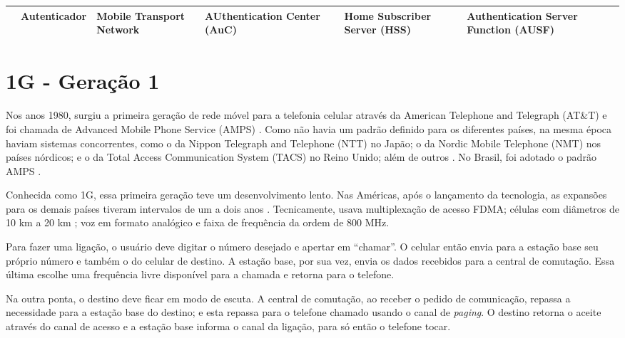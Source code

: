 \documentclass[11pt,oneside,a4paper]{abntex2}
\begin{document}
\begin{center}
\begin{longtable}{|m{1.5cm}|m{2.5cm}|m{2cm}|m{2cm}|m{2cm}|m{2cm}|m{2cm}|}
                        & Autenticador                           & Mobile Transport Network   & AUthentication Center (AuC)              &                                                                                             & Home Subscriber Server (HSS)                                    & Authentication Server Function (AUSF)                                                                                                       \\ \hline
\end{longtable}
\end{center}

\section*{1G - Geração 1}
\label{1g}

Nos anos 1980, surgiu a primeira geração de rede móvel para a telefonia celular através da American Telephone and Telegraph (AT\&T) e foi chamada de Advanced Mobile Phone Service (AMPS) \cite{tcc1}. Como não havia um padrão definido para os diferentes países, na mesma época haviam sistemas concorrentes, como o da Nippon Telegraph and Telephone (NTT) no Japão; o da Nordic Mobile Telephone (NMT) nos países nórdicos; e o da Total Access Communication System (TACS) no Reino Unido; além de outros \cite{wiki-1g-br, wiki-1g-en}. No Brasil, foi adotado o padrão AMPS \cite{tcc2}.

Conhecida como 1G, essa primeira geração teve um desenvolvimento lento. Nas Américas, após o lançamento da tecnologia, as expansões para os demais países tiveram intervalos de um a dois anos \cite{repor1}. Tecnicamente, usava multiplexação de acesso FDMA; células com diâmetros de 10 km a 20 km \cite{aula3}; voz em formato analógico e faixa de frequência da ordem de 800 MHz.

Para fazer uma ligação, o usuário deve digitar o número desejado e apertar em ``chamar''. O celular então envia para a estação base seu próprio número e também o do celular de destino. A estação base, por sua vez, envia os dados recebidos para a central de comutação. Essa última escolhe uma frequência livre disponível para a chamada e retorna para o telefone.

Na outra ponta, o destino deve ficar em modo de escuta. A central de comutação, ao receber o pedido de comunicação, repassa a necessidade para a estação base do destino; e esta repassa para o telefone chamado  usando o canal de \textit{paging}. O destino retorna o aceite através do canal de acesso e a estação base informa o canal da ligação, para só então o telefone tocar.
\end{document}
